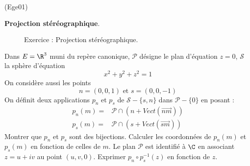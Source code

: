 \begin{tiny}(Ege01)\end{tiny}
\textbf{Projection st{\'e}r{\'e}ographique}.
\begin{figure}[ht]
	\centering
	
	\caption{Exercice :  Projection stéréographique.}
	\label{fig:Ege01_1}
\end{figure}

Dans $E=\R^{3}$ muni du rep{\`e}re canonique, $\mathcal{P}$ d{\'e}signe le plan d'{\'e}quation $z=0$, $\mathcal{S}$ la sph{\`e}re d'{\'e}quation 
\[ x^{2}+y^{2}+z^{2}=1\]
On consid{\`e}re aussi les points 
\begin{displaymath}
n=(0,0,1) \text{ et } s=(0,0,-1) 
\end{displaymath}
On d{\'e}finit deux applications $p_{n}$ et $p_{s}$ de $\mathcal{S}-\{s,n\}$ dans $\mathcal{P}-\{0\}$ en posant :
\begin{align*}
p_{n}(m) =&\mathcal{P}\cap \left( n + Vect(\overrightarrow{nm})\right) \\
p_{s}(m) =&\mathcal{P}\cap \left( s + Vect(\overrightarrow{sm})\right)
\end{align*}
Montrer que $p_{n}$ et $p_{s}$ sont des bijections. Calculer les coordonn{\'e}es de $p_{n}(m)$ et $p_{s}(m)$ en fonction de celles de $m$.\newline
Le plan $\mathcal{P}$ est identifi{\'e} {\`a} $\C$ en associant $z=u+iv$ au point $(u,v,0)$. Exprimer $p_{n}\circ p_{s}^{-1}(z)$ en fonction de $z$.
